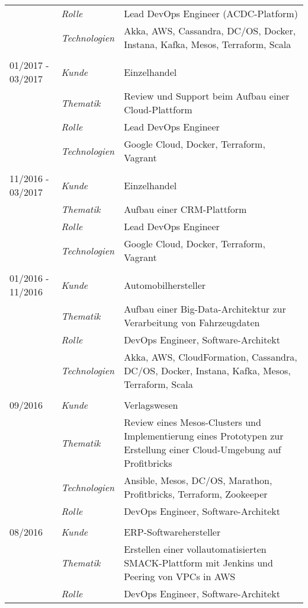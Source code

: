 \begin{longtable}{@{}>{}p{4cm}>{\itshape}p{2cm}>{}p{9cm}}
\nopagebreak		& Rolle 	      & Lead DevOps Engineer (ACDC-Platform)\\
\nopagebreak		& Technologien	& Akka, AWS, Cassandra, DC/OS, Docker, Instana, Kafka, Mesos, Terraform, Scala\\
\\
01/2017 - 03/2017     & Kunde 	& Einzelhandel\\
\nopagebreak		& Thematik	    & Review und Support beim Aufbau einer Cloud-Plattform\\
\nopagebreak		& Rolle 	      & Lead DevOps Engineer\\
\nopagebreak		& Technologien	& Google Cloud, Docker, Terraform, Vagrant\\
\\
11/2016 - 03/2017     & Kunde 	& Einzelhandel\\
\nopagebreak		& Thematik	    & Aufbau einer CRM-Plattform\\
\nopagebreak		& Rolle 	      & Lead DevOps Engineer\\
\nopagebreak		& Technologien	& Google Cloud, Docker, Terraform, Vagrant\\
\\
01/2016 - 11/2016     & Kunde 	& Automobilhersteller\\
\nopagebreak		& Thematik	    & Aufbau einer Big-Data-Architektur zur Verarbeitung von Fahrzeugdaten\\
\nopagebreak		& Rolle 	      & DevOps Engineer, Software-Architekt\\
\nopagebreak		& Technologien	& Akka, AWS, CloudFormation, Cassandra, DC/OS, Docker, Instana, Kafka, Mesos, Terraform, Scala\\
\\
09/2016             & Kunde 	    & Verlagswesen\\
\nopagebreak		& Thematik	    & Review eines Mesos-Clusters und Implementierung eines Prototypen zur Erstellung einer Cloud-Umgebung auf Profitbricks\\
\nopagebreak		& Technologien	& Ansible, Mesos, DC/OS, Marathon, Profitbricks, Terraform, Zookeeper\\
\nopagebreak		& Rolle 	    & DevOps Engineer, Software-Architekt\\
\\
08/2016             & Kunde 	    & ERP-Softwarehersteller\\
\nopagebreak		& Thematik	    & Erstellen einer vollautomatisierten SMACK-Plattform mit Jenkins und Peering von VPCs in AWS\\
\nopagebreak		& Rolle 	    & DevOps Engineer, Software-Architekt\\

\end{longtable}
